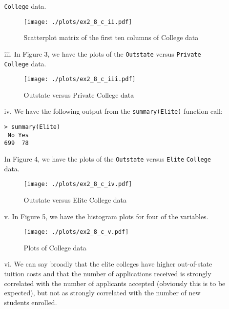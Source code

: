\begin{itemize}
\begin{itemize}
        \verb|College| data.
        \begin{figure}[!ht]
            \texttt{[image: ./plots/ex2\_8\_c\_ii.pdf]}
            \caption{Scatterplot matrix of the first ten columns of College data}
        \end{figure}
        \item[iii.] In Figure 3, we have the plots of the \verb|Outstate| versus 
        \verb|Private| \verb|College| data.
        \begin{figure}[!ht]
            \texttt{[image: ./plots/ex2\_8\_c\_iii.pdf]}
            \caption{Outstate versus Private College data}
        \end{figure}
        \item[iv.] We have the following output from the \verb|summary(Elite)| function call:
        \begin{verbatim}
> summary(Elite)
 No Yes 
699  78 
        \end{verbatim}
        In Figure 4, we have the plots of the \verb|Outstate| versus 
        \verb|Elite| \verb|College| data.
        \begin{figure}[!ht]
            \texttt{[image: ./plots/ex2\_8\_c\_iv.pdf]}
            \caption{Outstate versus Elite College data}
        \end{figure}
        \item[v.] In Figure 5, we have the histogram plots for four of the variables.
        \begin{figure}[!ht]
            \texttt{[image: ./plots/ex2\_8\_c\_v.pdf]}
            \caption{Plots of College data}
        \end{figure}
        \item[vi.] We can say broadly that the elite colleges have higher out-of-state tuition 
        costs and that the number of applications received is strongly correlated with the
        number of applicants accepted (obviously this is to be expected), but not as strongly
        correlated with the number of new students enrolled.
    \end{itemize}
\end{itemize}
